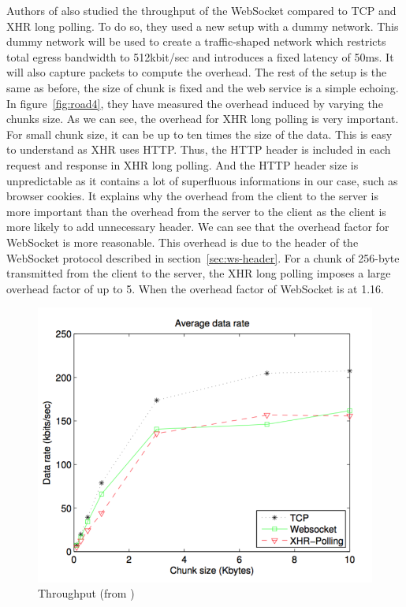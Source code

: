 \documentclass[journal,compsoc]{IEEEtran}
\newcommand{\ws}{WebSocket}
\begin{document}
Authors of \cite{roadblock} also studied the throughput of the \ws{} compared to TCP and XHR long polling.
To do so, they used a new setup with a dummy network.
This dummy network will be used to create a traffic-shaped network which restricts total egress  bandwidth to 512kbit/sec and introduces a fixed latency of 50ms.
It will also capture packets to compute the overhead.
The rest of the setup is the same as before, the size of chunk is fixed and the web service is a simple echoing.
In figure~\ref{fig:road4}, they have measured the overhead induced by varying the chunks size.
As we can see, the overhead for XHR long polling is very important.
For small chunk size, it can be up to ten times the size of the data.
This is easy to understand as XHR uses HTTP.
Thus, the HTTP header is included in each request and response in XHR long polling.
And the HTTP header size is unpredictable as it contains a lot of superfluous informations in our case, such as browser cookies.
It explains why the overhead from the client to the server is more important than the overhead from the server to the client as the client is more likely to add unnecessary header.
We can see that the overhead factor for \ws{} is more reasonable.
This overhead is due to the header of the \ws{} protocol described in section~\ref{sec:ws-header}.
For a chunk of 256-byte transmitted from the client to the server, the XHR long polling imposes a large overhead factor of up to 5.
When the overhead factor of \ws{} is at 1.16.


\begin{figure}[!ht]
    \centering
    \includegraphics[width=\linewidth]{road3.png}
    \caption{Throughput (from \cite{roadblock})}
    \label{fig:road3}
\end{figure}
\end{document}
